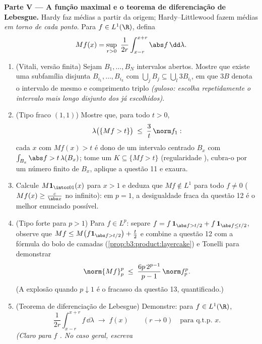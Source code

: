 \begin{problem}
\medskip
\noindent\textbf{Parte V --- A função maximal e o teorema de
diferenciação de Lebesgue.} Hardy faz médias a partir da origem;
Hardy--Littlewood fazem médias \emph{em torno de cada ponto}. Para
$f \in L^1(\R)$, defina
\[
Mf(x) = \sup_{r>0}\ \frac1{2r}\int_{x-r}^{x+r}\abs
f\,\dd\lambda .
\]
\begin{enumerate}[resume]
  \item (Vitali, versão finita) Sejam $B_1, \dots, B_N$ intervalos abertos. Mostre
        que existe uma subfamília disjunta $B_{i_1}, \dots, B_{i_k}$ com $\bigcup_jB_j
        \subseteq \bigcup_l3B_{i_l}$, em que
        $3B$ denota o intervalo de mesmo  e comprimento triplo
        \emph{(guloso: escolha repetidamente o intervalo mais longo
        disjunto dos já escolhidos)}.
  \item (Tipo fraco $(1,1)$) Mostre que, para todo $t > 0$,
        \[
        \lambda\bigl(\{Mf > t\}\bigr) \;\leq\;
        \frac3t\,\norm f_1 :
        \]
        cada $x$ com $Mf(x) > t$ é dono de um intervalo centrado $B_x$
        com $\int_{B_x}\abs f > t\,\lambda(B_x)$; tome um  $K \subseteq \{Mf > t\}$ (regularidade ),
        cubra-o por um número finito de $B_x$, aplique a questão 11
        e exaura.
  \item Calcule $M\mathbf 1_{\intcc01}(x)$ para $x > 1$ e deduza que $Mf \notin L^1$ para todo $f \neq 0$
        ($Mf(x) \geq \frac c{\abs x}$ no infinito): em $p =
        1$, a desigualdade fraca da
        questão 12 é o melhor enunciado possível.
  \item (Tipo forte para $p > 1$) Para $f \in L^p$: separe $f =
        f\,\mathbf 1_{\abs f > t/2} + f\,\mathbf 1_{\abs f
        \leq t/2}$, observe
        que $Mf \leq M\bigl(f\mathbf 1_{\abs
        f > t/2}\bigr) + \frac t2$ e combine a questão 12 com a fórmula do bolo de
        camadas (\cref{prop:b3:product:layercake}) e Tonelli para demonstrar
        \[
        \norm{Mf}_p^p \;\leq\;
        \frac{6p\,2^{p-1}}{p-1}\,\norm f_p^p .
        \]
        (A explosão quando $p \downarrow 1$ é o fracasso da questão 13,
        quantificado.)
  \item (Teorema de diferenciação de Lebesgue) Demonstre: para $f \in
        L^1(\R)$,
        \[
        \frac1{2r}\int_{x-r}^{x+r}f\,\dd\lambda
        \;\longrightarrow\; f(x)
        \qquad (r \to 0)\quad\text{para q.t.p.\ }x .
        \]
        \emph{(Claro para $f$ . No caso geral, escreva
}
\end{enumerate}
\end{problem}
